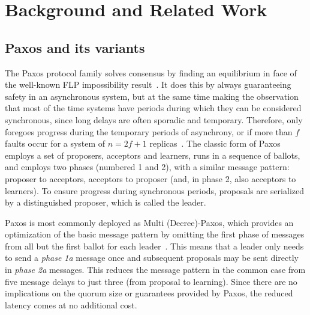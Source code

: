 \section{Background and Related Work}
\label{sec:related} 
\subsection{Paxos and its variants} \label{Paxos} 

The Paxos protocol family solves consensus by finding an equilibrium in face of the well-known FLP impossibility result~\cite{FLP85}. It does this by always guaranteeing safety in an asynchronous system, but at the same time making the observation that most of the time systems have periods during which they can be considered synchronous, since long delays are often sporadic and temporary. Therefore, only foregoes progress during the temporary periods of asynchrony, or if more than $f$ faults occur for a system of $n=2f+1$ replicas~\cite{L01}. The classic form of Paxos employs a set of proposers, acceptors and learners, runs in a sequence of ballots, and employs two phases (numbered 1 and 2), with a similar message pattern: proposer to acceptors, acceptors to proposer (and, in phase 2, also acceptors to learners). To ensure progress during synchronous periods, proposals are serialized by a distinguished proposer, which is called the leader.\par
Paxos is most commonly deployed as Multi (Decree)-Paxos, which provides an optimization of the basic message pattern by omitting the first phase of messages from all but the first ballot for each leader~\cite{Renesse2011}. This means that a leader only needs to send a \textit{phase 1a} message once and subsequent proposals may be sent directly in \textit{phase 2a} messages. This reduces the message pattern in the common case from five message delays to just three (from proposal to learning). Since there are no implications on the quorum size or guarantees provided by Paxos, the reduced latency comes at no additional cost. \par

